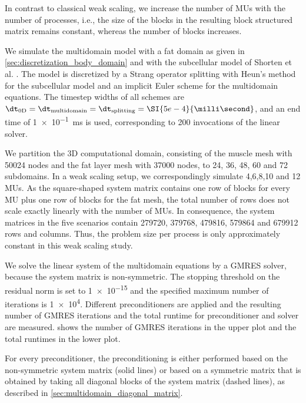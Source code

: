 In contrast to classical weak scaling, we increase the number of MUs with the number of processes, i.e., the size of the blocks in the resulting block structured matrix remains constant, whereas the number of blocks increases.

We simulate the multidomain model with a fat domain as given in \cref{sec:discretization_body_domain} and with the subcellular model of Shorten et al. \cite{Shorten2007}. 
The model is discretized by a Strang operator splitting with Heun's method for the subcellular model and an implicit Euler scheme for the multidomain equations. The timestep widths of all schemes are $\dt_\text{0D}=\dt_\text{multidomain}=\dt_\text{splitting}=\SI{5e-4}{\milli\second}$, and an end time of \SI{1e-1}{\milli\second} is used, corresponding to 200 invocations of the linear solver.

We partition the 3D computational domain, consisting of the muscle mesh with \num{50024} nodes and the fat layer mesh with \num{37000} nodes, to 24, 36, 48, 60 and 72 subdomains. In a weak scaling setup, we correspondingly simulate 4,6,8,10 and 12 MUs.
As the square-shaped system matrix contains one row of blocks for every MU plus one row of blocks for the fat mesh, the total number of rows does not scale exactly linearly with the number of MUs. In consequence, the system matrices in the five scenarios contain \num{279720}, \num{379768}, \num{479816}, \num{579864} and \num{679912} rows and columns. Thus, the problem size per process is only approximately constant in this weak scaling study.


We solve the linear system of the multidomain equations by a GMRES solver, because the system matrix is non-symmetric.
The stopping threshold on the residual norm is set to \num{1e-15} and the specified maximum number of iterations is \num{1e4}. 
Different preconditioners are applied and the resulting number of GMRES iterations and the total runtime for preconditioner and solver are measured.
 shows the number of GMRES iterations in the upper plot and the total runtimes in the lower plot.

For every preconditioner, the preconditioning is either performed based on the non-symmetric system matrix (solid lines) or based on a symmetric matrix that is obtained by taking all diagonal blocks of the system matrix (dashed lines), as described in \cref{sec:multidomain_diagonal_matrix}.

